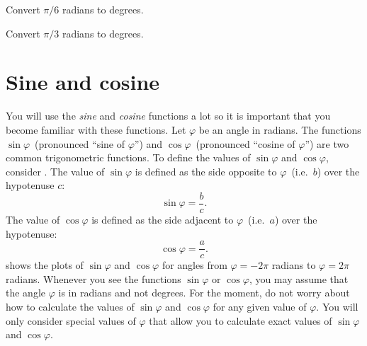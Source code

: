 \documentclass[a4paper,oneside,12pt]{article}
\begin{document}
\begin{exercise}
Convert $\pi / 6$ radians to degrees.
\end{exercise}


\begin{exercise}
Convert $\pi / 3$ radians to degrees.
\end{exercise}




\section{Sine and cosine}

You will use the \emph{sine} and \emph{cosine} functions a lot so it
is important that you become familiar with these functions.  Let
$\varphi$ be an angle in radians.  The functions
$\sin\varphi$~(pronounced ``sine of $\varphi$'') and
$\cos\varphi$~(pronounced ``cosine of $\varphi$'') are two common
trigonometric functions.  To define the values of $\sin\varphi$ and
$\cos\varphi$, consider .
The value of $\sin\varphi$ is defined as the side opposite to
$\varphi$~(i.e.~$b$) over the hypotenuse $c$:
\begin{equation}
\label{eqn:define_sine}
\sin\varphi
=
\frac{b}{c}.
\end{equation}
The value of $\cos\varphi$ is defined as the side adjacent to
$\varphi$~(i.e.~$a$) over the hypotenuse:
\begin{equation}
\label{eqn:define_cosine}
\cos\varphi
=
\frac{a}{c}.
\end{equation}
 shows the plots of $\sin\varphi$ and
$\cos\varphi$ for angles from $\varphi = -2\pi$ radians to
$\varphi = 2\pi$ radians.  Whenever you see the functions
$\sin\varphi$ or $\cos\varphi$, you may assume that the angle
$\varphi$ is in radians and not degrees.  For the moment, do not worry
about how to calculate the values of $\sin\varphi$ and $\cos\varphi$
for any given value of $\varphi$.  You will only consider special
values of $\varphi$ that allow you to calculate exact values of
$\sin\varphi$ and $\cos\varphi$.
\end{document}
